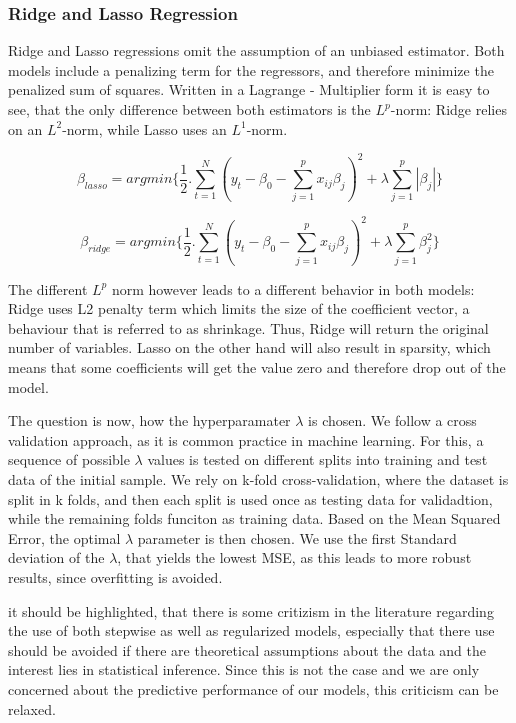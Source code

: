 \subsubsection{Ridge and Lasso Regression}
Ridge and Lasso regressions omit the assumption of an unbiased estimator. Both models include a penalizing term for the regressors, and therefore minimize the penalized sum of squares.  Written in a Lagrange - Multiplier form it is easy to see, that the only difference between both estimators is the $L^{p}$-norm: Ridge relies on an $L^{2}$-norm, while Lasso uses an  $L^{1}$-norm.  

\begin{equation}
\beta_{lasso}=argmin\{\frac{1}{2}.\sum_{t=1}^{N}(y_{t}-\beta_{0}-\sum_{j=1}^{p}x_{ij}\beta_{j})^{2}+\lambda\sum_{j=1}^{p}|\beta_{j}|\}
\end{equation}

\begin{equation}
\beta_{ridge}=argmin\{\frac{1}{2}.\sum_{t=1}^{N}(y_{t}-\beta_{0}-\sum_{j=1}^{p}x_{ij}\beta_{j})^{2}+\lambda\sum_{j=1}^{p}\beta_{j}^{2}\}
\end{equation}

The different $L^{p}$ norm however leads to a different behavior in both models: Ridge uses L2 penalty term which limits the size of the coefficient vector, a behaviour that is referred to as shrinkage. Thus, Ridge will return the original number of variables.  Lasso on the other hand will also result in sparsity, which means that some coefficients will get the value zero and therefore drop out of the model. 

The question is now, how the hyperparamater $\lambda$ is chosen. We follow a cross validation approach, as it is common practice in machine learning. For this, a sequence of possible $\lambda$ values is tested on different splits into training and test data of the initial sample.  We rely on  k-fold cross-validation, where the dataset is split in k folds, and then each split is used once as testing data for validadtion, while the remaining folds funciton as training data. 
Based on the Mean Squared Error, the optimal $\lambda$ parameter is then chosen. We use the first Standard deviation of the $\lambda$, that yields the lowest MSE, as this leads to more robust results, since overfitting is avoided. 

it should be highlighted, that there is some critizism in the literature regarding the use of both stepwise as well as regularized models, especially that there use should be avoided if there are theoretical assumptions about the data and the interest lies in statistical inference. Since this is not the case and we are only concerned about the predictive performance of our models, this criticism can be relaxed. 



